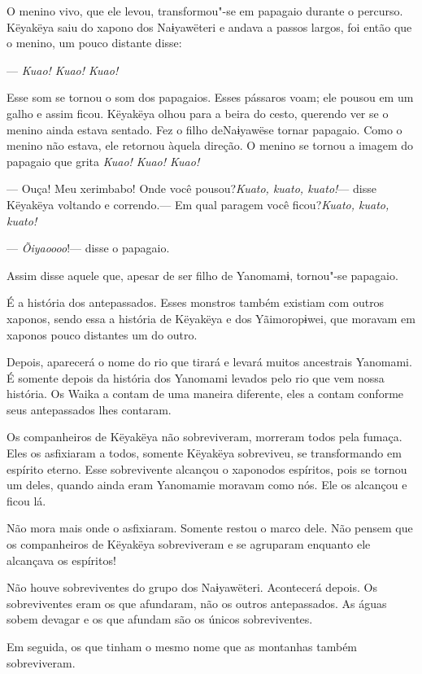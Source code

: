 O menino vivo, que ele levou, transformou"-se em papagaio durante o
percurso. Këyakëya saiu do xapono dos Naɨyawëteri e andava a passos
largos, foi então que o menino, um pouco distante disse: 

--- \emph{Kuao! Kuao! Kuao!}

Esse som se tornou o som dos papagaios. Esses pássaros voam; ele pousou
em um galho e assim ficou. Këyakëya olhou para a beira do cesto,
querendo ver se o menino ainda estava sentado. Fez o filho deNaɨyawëse
tornar papagaio. Como o menino não estava, ele retornou àquela direção.
O menino se tornou a imagem do papagaio que grita \emph{Kuao! Kuao!
Kuao!}

--- Ouça! Meu xerimbabo! Onde você pousou?\emph{Kuato, kuato, kuato!}---
disse Këyakëya voltando e correndo.--- Em qual paragem você
ficou?\emph{Kuato, kuato, kuato!}

--- \emph{Õiyaoooo}!--- disse o papagaio. 

Assim disse aquele que, apesar de ser filho de Yanomamɨ, tornou"-se
papagaio. 

É a história dos antepassados. Esses monstros também existiam com outros
xaponos, sendo essa a história de Këyakëya e dos Yãimoropɨwei, que
moravam em xaponos pouco distantes um do outro. 

Depois, aparecerá o nome do rio que tirará e levará muitos ancestrais
Yanomami. É somente depois da história dos Yanomami levados pelo rio que
vem nossa história. Os Waika a contam de uma maneira diferente, eles a
contam conforme seus antepassados lhes contaram. 

Os companheiros de Këyakëya não sobreviveram, morreram todos pela
fumaça. Eles os asfixiaram a todos, somente Këyakëya sobreviveu, se
transformando em espírito eterno. Esse sobrevivente alcançou o xaponodos
espíritos, pois se tornou um deles, quando ainda eram Yanomamie moravam
como nós. Ele os alcançou e ficou lá. 

Não mora mais onde o asfixiaram. Somente restou o marco dele. Não pensem
que os companheiros de Këyakëya sobreviveram e se agruparam enquanto ele
alcançava os espíritos! 

Não houve sobreviventes do grupo dos Naɨyawëteri. Acontecerá depois. Os
sobreviventes eram os que afundaram, não os outros antepassados. As
águas sobem devagar e os que afundam são os únicos sobreviventes. 

Em seguida, os que tinham o mesmo nome que as montanhas também
sobreviveram. 

 

 
